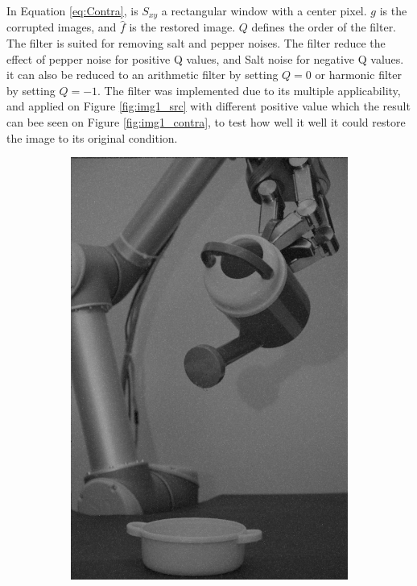 In Equation \ref{eq:Contra}, is $S_{xy}$ a rectangular  window with a center pixel. $g$ is the corrupted images, and $\hat{f}$ is the restored image. $Q$ defines the order of the filter.  \\[0.2cm]
The filter is suited for removing salt and pepper noises. The filter reduce the effect of pepper noise for positive Q values, and Salt noise for negative Q values. it can also be reduced to an arithmetic filter by setting $Q = 0$ or harmonic filter by setting $Q = -1$. The filter was implemented due to its multiple applicability, and applied on Figure \ref{fig:img1_src} with different positive value which the result can bee seen on Figure \ref{fig:img1_contra}, to test how well it well it could restore the image to its original condition.  

\begin{figure}[H]
    \centering
    \begin{subfigure}[b]{0.3\textwidth}
        \includegraphics[width=\textwidth]{img1/img_1_gaus_5_1.png}

\end{subfigure}
\end{figure}
